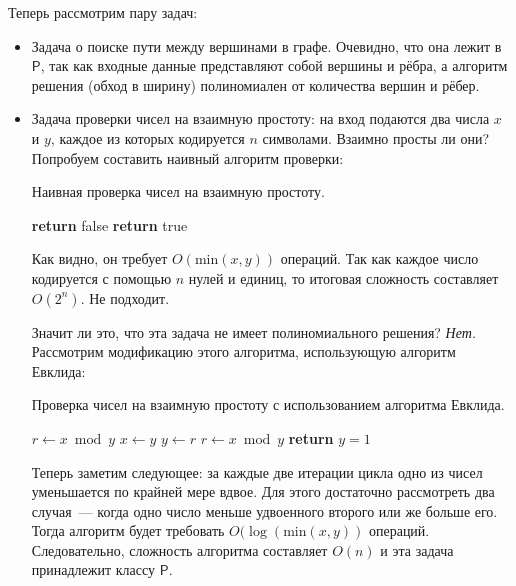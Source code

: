 \documentclass[a4paper,12pt]{article}
\newcommand{\Pclass}{\mathsf{P}}
\begin{document}
Теперь рассмотрим пару задач:
\begin{itemize}
    \item Задача о поиске пути между вершинами в графе. Очевидно, что она лежит в \(\Pclass\), так как входные данные представляют собой вершины и рёбра, а алгоритм решения (обход в ширину) полиномиален от количества вершин и рёбер.
    \item Задача проверки чисел на взаимную простоту: на вход подаются два числа \(x\) и \(y\), каждое из которых кодируется \(n\) символами. Взаимно просты ли они?
    Попробуем составить наивный алгоритм проверки:
    \begin{algorithm}[H]
        \caption{Наивная проверка чисел на взаимную простоту.}
        \begin{algorithmic}[1]
            \Statex
            \Statex
                    \State \textbf{return} false
                \EndIf
            \EndFor
            \State \textbf{return} true
        \end{algorithmic}
    \end{algorithm}
    Как видно, он требует \(O(\text{min}(x, y))\) операций. Так как каждое число кодируется с помощью \(n\) нулей и единиц, то итоговая сложность составляет \(O(2^n)\). Не подходит.
        
    Значит ли это, что эта задача не имеет полиномиального решения? \emph{Нет.} Рассмотрим модификацию этого алгоритма, использующую алгоритм Евклида:
    \begin{algorithm}[H]
        \caption{Проверка чисел на взаимную простоту с использованием алгоритма Евклида.}
        \begin{algorithmic}[1]
            \Statex
            \Statex
            \State \(r \gets x \bmod y\)
                \State \(x \gets y\)
                \State \(y \gets r\)
                \State \(r \gets x \bmod y\)
            \EndWhile
            \State \textbf{return} \(y = 1\)
        \end{algorithmic}
    \end{algorithm}
    Теперь заметим следующее: за каждые две итерации цикла одно из чисел уменьшается по крайней мере вдвое. Для этого достаточно рассмотреть два случая~--- когда одно число меньше удвоенного второго или же больше его. Тогда алгоритм будет требовать \(O(\log(\text{min}(x, y))\) операций. Следовательно, сложность алгоритма составляет \(O(n)\) и эта задача принадлежит классу \(\Pclass\).
    \end{itemize}
    
\end{document}
